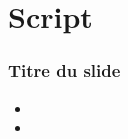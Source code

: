 \section{Script}

\begin{frame}
	\frametitle{\textbf{Titre du slide}}
	\begin{itemize}
		\item 
		\item 
	\end{itemize}
\end{frame}

